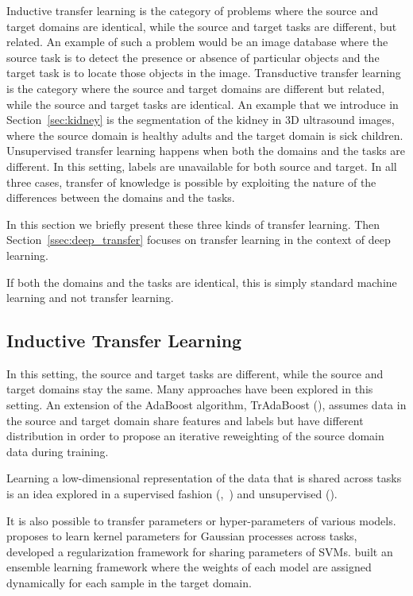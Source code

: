 Inductive transfer learning is the category of problems where the source and target domains are identical, while the source and target tasks are different, but related. An example of such a problem would be an image database where the source task is to detect the presence or absence of particular objects and the target task is to locate those objects in the image. Transductive transfer learning is the category where the source and target domains are different but related, while the source and target tasks are identical. An example that we introduce in Section~\ref{sec:kidney} is the segmentation of the kidney in 3D ultrasound images, where the source domain is healthy adults and the target domain is sick children. Unsupervised transfer learning happens when both the domains and the tasks are different. In this setting, labels are unavailable for both source and target. In all three cases, transfer of knowledge is possible by exploiting the nature of the differences between the domains and the tasks.

In this section we briefly present these three kinds of transfer learning. Then Section~\ref{ssec:deep_transfer} focuses on transfer learning in the context of deep learning.

If both the domains and the tasks are identical, this is simply standard machine learning and not transfer learning.

\subsection{Inductive Transfer Learning}
\label{ssec:inductive}

In this setting, the source and target tasks are different, while the source and target domains stay the same. Many approaches have been explored in this setting. An extension of the AdaBoost algorithm, TrAdaBoost (\textcite{dai2007ICML}), assumes data in the source and target domain share features and labels but have different distribution in order to propose an iterative reweighting of the source domain data during training. 

Learning a low-dimensional representation of the data that is shared across tasks is an idea explored in a supervised fashion (\textcite{argyriou2006NIPS},~\textcite{lee2007ICML}) and unsupervised (\textcite{raina2007ICML}).

It is also possible to transfer parameters or hyper-parameters of various models. \textcite{lawrence2004ICML} proposes to learn kernel parameters for Gaussian processes across tasks,~\textcite{evgeniou2004} developed a regularization framework for sharing parameters of SVMs. \textcite{gao2008} built an ensemble learning framework where the weights of each model are assigned dynamically for each sample in the target domain.

